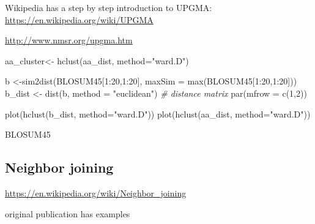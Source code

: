 \documentclass[
]{book}
\newenvironment{Shaded}{\begin{snugshade}}{\end{snugshade}}
\newcommand{\AttributeTok}[1]{\textcolor[rgb]{0.77,0.63,0.00}{#1}}
\newcommand{\CommentTok}[1]{\textcolor[rgb]{0.56,0.35,0.01}{\textit{#1}}}
\newcommand{\DecValTok}[1]{\textcolor[rgb]{0.00,0.00,0.81}{#1}}
\newcommand{\FunctionTok}[1]{\textcolor[rgb]{0.00,0.00,0.00}{#1}}
\newcommand{\NormalTok}[1]{#1}
\newcommand{\OtherTok}[1]{\textcolor[rgb]{0.56,0.35,0.01}{#1}}
\newcommand{\SpecialCharTok}[1]{\textcolor[rgb]{0.00,0.00,0.00}{#1}}
\newcommand{\StringTok}[1]{\textcolor[rgb]{0.31,0.60,0.02}{#1}}
\begin{document}
Wikipedia has a step by step introduction to UPGMA: \url{https://en.wikipedia.org/wiki/UPGMA}

\url{http://www.nmsr.org/upgma.htm}

\begin{Shaded}
\begin{Highlighting}[]
\NormalTok{aa\_cluster}\OtherTok{\textless{}{-}} \FunctionTok{hclust}\NormalTok{(aa\_dist, }\AttributeTok{method=}\StringTok{"ward.D"}\NormalTok{)}
\end{Highlighting}
\end{Shaded}

\begin{Shaded}
\begin{Highlighting}[]
\NormalTok{b }\OtherTok{\textless{}{-}}\FunctionTok{sim2dist}\NormalTok{(BLOSUM45[}\DecValTok{1}\SpecialCharTok{:}\DecValTok{20}\NormalTok{,}\DecValTok{1}\SpecialCharTok{:}\DecValTok{20}\NormalTok{], }\AttributeTok{maxSim =} \FunctionTok{max}\NormalTok{(BLOSUM45[}\DecValTok{1}\SpecialCharTok{:}\DecValTok{20}\NormalTok{,}\DecValTok{1}\SpecialCharTok{:}\DecValTok{20}\NormalTok{]))}
\NormalTok{b\_dist }\OtherTok{\textless{}{-}} \FunctionTok{dist}\NormalTok{(b, }\AttributeTok{method =} \StringTok{"euclidean"}\NormalTok{) }\CommentTok{\# distance matrix}
\FunctionTok{par}\NormalTok{(}\AttributeTok{mfrow =} \FunctionTok{c}\NormalTok{(}\DecValTok{1}\NormalTok{,}\DecValTok{2}\NormalTok{))}


\FunctionTok{plot}\NormalTok{(}\FunctionTok{hclust}\NormalTok{(b\_dist, }\AttributeTok{method=}\StringTok{"ward.D"}\NormalTok{))}
\FunctionTok{plot}\NormalTok{(}\FunctionTok{hclust}\NormalTok{(aa\_dist, }\AttributeTok{method=}\StringTok{"ward.D"}\NormalTok{))}
\end{Highlighting}
\end{Shaded}

\begin{Shaded}
\begin{Highlighting}[]
\NormalTok{BLOSUM45}
\end{Highlighting}
\end{Shaded}

\hypertarget{neighbor-joining}{%
\subsection{Neighbor joining}\label{neighbor-joining}}

\url{https://en.wikipedia.org/wiki/Neighbor_joining}

original publication has examples
\end{document}
